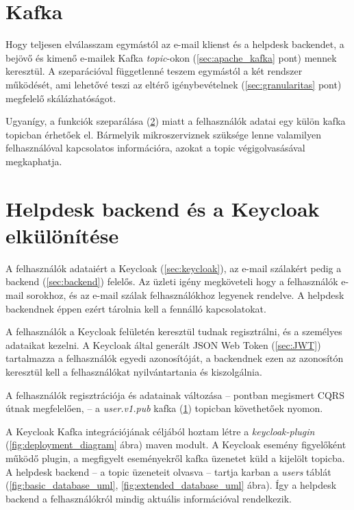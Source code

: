 \section{Kafka}\label{sec:implementacio_kafka}
Hogy teljesen elválasszam egymástól az e-mail klienst és a helpdesk backendet, a bejövő és kimenő e-mailek Kafka \textit{topic}-okon (\ref{sec:apache_kafka} pont) mennek keresztül. A szeparációval függetlenné teszem egymástól a két rendszer működését, ami lehetővé teszi az eltérő igénybevételnek (\ref{sec:granularitas} pont) megfelelő skálázhatóságot.

Ugyanígy, a funkciók szeparálása (\ref{sec:backend_keycloak_separation}) miatt a felhasználók adatai egy külön kafka topicban érhetőek el. Bármelyik mikroszerviznek szüksége lenne valamilyen felhasználóval kapcsolatos információra, azokat a topic végigolvasásával megkaphatja.



\section{Helpdesk backend és a Keycloak elkülönítése}\label{sec:backend_keycloak_separation}
A felhasználók adataiért a Keycloak (\ref{sec:keycloak}), az e-mail szálakért pedig a backend (\ref{sec:backend}) felelős. Az üzleti igény megköveteli hogy a felhasználók e-mail sorokhoz, és az e-mail szálak felhasználókhoz legyenek rendelve. A helpdesk backendnek éppen ezért tárolnia kell a fennálló kapcsolatokat.

A felhasználók a Keycloak felületén keresztül tudnak regisztrálni, és a személyes adataikat kezelni. A Keycloak által generált JSON Web Token (\ref{sec:JWT}) tartalmazza a felhasználók egyedi azonosítóját, a backendnek ezen az azonosítón keresztül kell a felhasználókat nyilvántartania és kiszolgálnia.

A felhasználók regisztrációja és adatainak változása --   pontban megismert CQRS útnak megfelelően, --   a \textit{user.v1.pub} kafka (\ref{sec:implementacio_kafka}) topicban követhetőek nyomon.

A Keycloak Kafka integrációjának céljából hoztam létre a \textit{keycloak-plugin} (\ref{fig:deployment_diagram} ábra) maven modult. A Keycloak esemény figyelőként működő plugin, a megfigyelt eseményekről kafka üzenetet küld a kijelölt topicba. A helpdesk backend --  a topic üzeneteit olvasva --   tartja karban a \textit{users} táblát (\ref{fig:basic_database_uml}, \ref{fig:extended_database_uml} ábra). Így a helpdesk backend a felhasználókról mindig aktuális információval rendelkezik.


